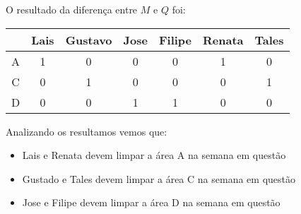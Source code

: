 \documentclass{article}
\begin{document}
    O resultado da diferença entre $M$ e $Q$ foi: \\
    
    \begin{tabular}{c|cccccc}
          &    Lais  &  Gustavo   &    Jose  &     Filipe &      Renata  &    Tales \\ \hline
        A &    1     &  0         &    0     &     0      &      1       &    0 \\
        C &    0     &  1         &    0     &     0      &      0       &    1 \\
        D &    0     &  0         &    1     &     1      &      0       &    0 \\
    \end{tabular}
    
    \vspace{1cm}
    
    Analizando os resultamos vemos que:
    \begin{itemize}
        \item Lais e Renata devem limpar a área A na semana em questão
        \item Gustado e Tales devem limpar a área C na semana em questão
        \item Jose e Filipe devem limpar a área D na semana em questão
    \end{itemize}
\end{document}
